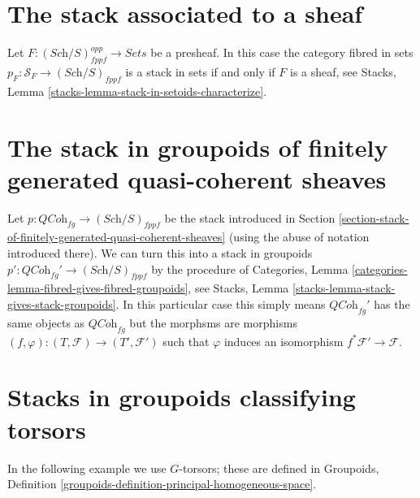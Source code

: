 \section{The stack associated to a sheaf}
\label{section-stack-associated-to-sheaf}

\noindent
Let $F : (\textit{Sch}/S)_{fppf}^{opp} \to \textit{Sets}$ be a presheaf.
In this case the category fibred in sets
$p_F : \mathcal{S}_F \to (\textit{Sch}/S)_{fppf}$
is a stack in sets if and only if $F$ is a sheaf, see
Stacks, Lemma \ref{stacks-lemma-stack-in-setoids-characterize}.



\section{The stack in groupoids of finitely generated quasi-coherent sheaves}
\label{section-stack-in-groupoids-of-quasi-coherent-sheaves}

\noindent
Let $p : \textit{QCoh}_{fg} \to (\textit{Sch}/S)_{fppf}$ be the stack
introduced in
Section \ref{section-stack-of-finitely-generated-quasi-coherent-sheaves}
(using the abuse of notation introduced there).
We can turn this into a stack in groupoids
$p' : \textit{QCoh}_{fg}' \to (\textit{Sch}/S)_{fppf}$ by
the procedure of
Categories, Lemma \ref{categories-lemma-fibred-gives-fibred-groupoids},
see
Stacks, Lemma \ref{stacks-lemma-stack-gives-stack-groupoids}.
In this particular case this simply means $\textit{QCoh}_{fg}'$ has
the same objects as $\textit{QCoh}_{fg}$ but the morphsms are
morphisms $(f, \varphi) : (T, \mathcal{F}) \to (T', \mathcal{F}')$
such that $\varphi$ induces an isomorphism $f^*\mathcal{F}' \to \mathcal{F}$.






\section{Stacks in groupoids classifying torsors}
\label{section-torsors}

\medskip\noindent
In the following example we use $G$-torsors; these are defined in
Groupoids, Definition \ref{groupoids-definition-principal-homogeneous-space}.

